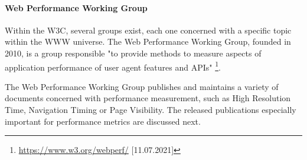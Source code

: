 

\paragraph{Web Performance Working Group}


Within the W3C, several groups exist, each one concerned with a specific topic within the WWW universe. %
The Web Performance Working Group, founded in 2010, is a group responsible "to provide methods to measure aspects of application performance of user agent features and APIs" \footnote{\url{https://www.w3.org/webperf/} [11.07.2021]}.


The Web Performance Working Group publishes and maintains a variety of documents concerned with performance measurement, such as High Resolution Time, Navigation Timing or Page Visibility. %
The released publications especially important for performance metrics are discussed next.






















